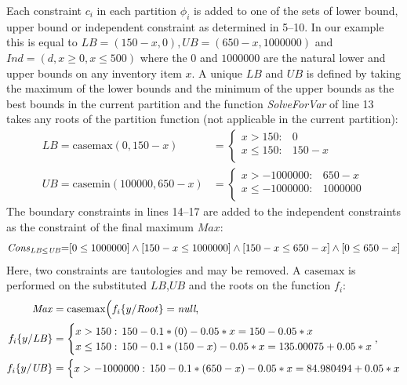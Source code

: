 \documentclass[twoside,11pt]{article}
\newcommand{\casemax}{\mathrm{casemax}}
\newcommand{\casemin}{\mathrm{casemin}}
\newcommand{\UB}{\mathit{UB}}
\newcommand{\LB}{\mathit{LB}}
\newcommand{\IND}{\mathit{Ind}}
\newcommand{\CONS}{\mathit{Cons}}
\newcommand{\Root}{\mathit{Root}}
\newcommand{\Max}{\mathit{Max}}
\newcommand{\sq}{\hspace{-1mm}}
\newcommand{\sqm}{\hspace{-2mm}}
\begin{document}
\begin{enumerate}
Each constraint $c_i$ in each partition $\phi_i$ is added to one of the sets of lower bound, upper bound or independent constraint as determined in 5--10. In our example this is equal to $\LB = (150 - x, 0) , \UB= (650 - x, 1000000) $ and $\IND=(d,x \geq 0 , x \leq 500) $ where the $0$ and $1000000$ are the natural lower and upper bounds on any inventory item $x$.
A unique $\LB$ and $\UB$ is defined by taking the maximum of the lower bounds and the minimum of the upper bounds as the best bounds in the current partition and the function \emph{SolveForVar} of line 13 takes any roots of the partition function (not applicable in the current partition): 
{%
\begin{align*}
\LB = \casemax(0,150-x) & = \begin{cases}
x > 150: & 0\\ 
x \leq 150: & 150 -x \\ 
\end{cases}\\
\UB = \casemin(100000, 650-x) & = \begin{cases}
x > -1000000: & 650 -x  \\ 
x \leq -1000000: &1000000\\ 
\end{cases}
\end{align*}
}  
The boundary constraints in lines 14--17 are added to the independent constraints as the constraint of the final maximum $\mathit{Max}$:
{%
\begin{equation*}
\CONS_{\LB \leq \UB} \sq = \sq [0 \leq 1000000] %
\land [150 - x \leq 1000000] \land [150-x \leq 650 -x] \land [0 \leq 650 - x] 
\end{equation*}}
Here, two constraints are tautologies and may be removed.
A $\casemax$ is performed on the substituted $\LB$,$\UB$ and the roots on the function $f_i$: 
{\footnotesize 
\begin{align*}
 \Max &= \casemax \Big( f_i \{ y / \Root \} = \textit{null} , \\
 f_i \{ y / \LB \} &= \begin{cases}
x > 150: & \sqm 150 - 0.1 * (0) - 0.05 * x = 150 - 0.05 * x \\ 
x \leq 150:    & \sqm 150 - 0.1 * (150 - x ) - 0.05 * x = 135.00075 + 0.05 * x\\ 
\end{cases},\\
 f_i \{ y / \UB \} &= \begin{cases}
x > -1000000:    & \sqm 150 - 0.1 * (650 -x) - 0.05 * x = 84.980494 + 0.05 * x \\ 

\end{cases}
\end{align*}}
\end{enumerate}
\end{document}

